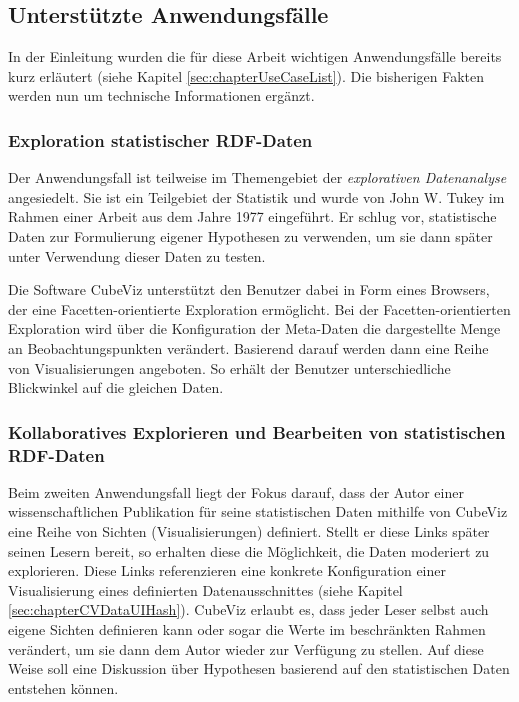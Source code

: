 \documentclass[11pt]{article}
\newcommand{\com}[1]{\marginpar{\em {\small{#1}}}} %
\begin{document}
%
%
\subsection{Unterstützte Anwendungsfälle}
\label{sec:chapterCVUseCases}

In der Einleitung wurden die für diese Arbeit wichtigen Anwendungsfälle bereits kurz erläutert (siehe Kapitel \ref{sec:chapterUseCaseList}).\com{Kapitel \ref{sec:chapterUseCaseList}, S. \pageref{sec:chapterUseCaseList}} Die bisherigen Fakten werden nun um technische Informationen ergänzt. 

%
%
\subsubsection{Exploration statistischer RDF-Daten}
\label{sec:chapterUC1}

Der Anwendungsfall  ist teilweise im Themengebiet der \textit{explorativen Datenanalyse} angesiedelt. Sie ist ein Teilgebiet der Statistik und wurde von John W. Tukey im Rahmen einer Arbeit aus dem Jahre 1977 eingeführt. Er schlug vor, statistische Daten zur Formulierung eigener Hypothesen zu verwenden, um sie dann später unter Verwendung dieser Daten zu testen.\cite{EXPLORE-STAT} 

Die Software CubeViz unterstützt den Benutzer dabei in Form eines Browsers, der eine Facetten-orientierte Exploration ermöglicht. Bei der Facetten-orientierten Exploration wird über die Konfiguration der Meta-Daten die dargestellte Menge an Beobachtungspunkten verändert. Basierend darauf werden dann eine Reihe von Visualisierungen angeboten. So erhält der Benutzer unterschiedliche Blickwinkel auf die gleichen Daten.

%
%
\subsubsection{Kollaboratives Explorieren und Bearbeiten von statistischen RDF-Daten}
\label{sec:chapterUC2}

Beim zweiten Anwendungsfall liegt der Fokus darauf, dass der Autor einer wissenschaftlichen Publikation für seine statistischen Daten mithilfe von CubeViz eine Reihe von Sichten (Visualisierungen) definiert. Stellt er diese Links später seinen Lesern bereit, so erhalten diese die Möglichkeit, die Daten moderiert zu explorieren. Diese Links referenzieren eine konkrete Konfiguration einer Visualisierung eines definierten Datenausschnittes (siehe Kapitel \ref{sec:chapterCVDataUIHash}).\com{Kapitel \ref{sec:chapterCVDataUIHash} \\ S. \pageref{sec:chapterCVDataUIHash}} CubeViz erlaubt es, dass jeder Leser selbst auch eigene Sichten definieren kann oder sogar die Werte im beschränkten Rahmen verändert, um sie dann dem Autor wieder zur Verfügung zu stellen. Auf diese Weise soll eine Diskussion über Hypothesen basierend auf den statistischen Daten entstehen können.
\end{document}
